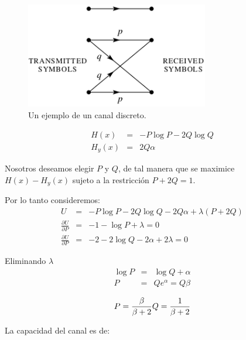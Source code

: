 \begin{figure}[!ht]
\centerline{\includegraphics[width=80mm]{Imagenes/SinComentarios/Pagina25-Figura11.png}}
\caption{Un ejemplo de un canal discreto.}
\label{fig:11}
\end{figure}

\begin{equation}
\begin{array}{rcl}
H(x) &=& -P\log{P} - 2Q\log{Q} \\
H_y(x) &=& 2Q\alpha
\end{array}
\end{equation}

Nosotros deseamos elegir $P$ y $Q$, de tal manera que se maximice
$H(x) - H_y(x)$ sujeto a la restricci\'on $P + 2Q = 1$.

Por lo tanto consideremos:
\begingroup
\renewcommand*{\arraystretch}{2.0}
\begin{equation}
\begin{array}{rcl}
U &=& -P\log{P} - 2Q\log{Q} -2Q\alpha + \lambda(P+2Q) \\
\displaystyle\frac{{\partial U}}{{\partial P}} &=& -1 - \log{P} + \lambda = 0 \\
\displaystyle\frac{{\partial U}}{{\partial P}} &=& -2 - 2\log{Q} -2\alpha + 2\lambda = 0
\end{array}
\end{equation}
\endgroup

Eliminando $\lambda$
\begin{equation}
\begin{array}{rcl}
\log{P} &=& \log{Q} + \alpha \\
P &=& Q e^\alpha = Q\beta 
\end{array}
\end{equation}

\begin{equation}
  P = \frac{\beta}{\beta + 2} \\ 
  Q = \frac{1}{\beta + 2}
\end{equation}

La capacidad del canal es de:

